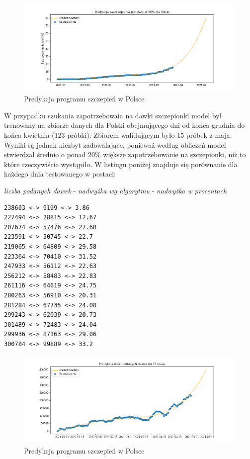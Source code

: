 \documentclass[12pt, oneside]{article}
\begin{document}
\begin{figure}[h!]
\centering
\includegraphics[height=0.25\textheight]{../img/PL_predict.png} 
\caption{Predykcja programu szczepień w Polsce}
\end{figure}

W przypadku szukania zapotrzebowaia na dawki szczepionki model był trenowany na zbiorze danych dla Polski obejmującego dni od końca grudnia do końca kwietnia (123 próbki). Zbiorem walidującym było 15 próbek z maja. Wyniki są jednak niezbyt zadowalające, ponieważ według obliczeń model stwierdzał średnio o ponad 20\% większe zapotrzebowanie na szczepionki, niż to które rzeczywiście wystąpiło. W listingu poniżej znajduje się porównanie dla każdego dnia testowanego w postaci:

 \textit{liczba podanych dawek} - \textit{nadwyżka wg algorytmu} - \textit{nadwyżka w procentach}

\begin{Verbatim}[tabsize=4]
238603 <-> 9199 <-> 3.86
227494 <-> 28815 <-> 12.67
207674 <-> 57476 <-> 27.68
223591 <-> 50745 <-> 22.7
219065 <-> 64809 <-> 29.58
223364 <-> 70410 <-> 31.52
247933 <-> 56112 <-> 22.63
256212 <-> 58483 <-> 22.83
261116 <-> 64619 <-> 24.75
280263 <-> 56910 <-> 20.31
281284 <-> 67735 <-> 24.08
299243 <-> 62039 <-> 20.73
301489 <-> 72483 <-> 24.04
299936 <-> 87163 <-> 29.06
300784 <-> 99889 <-> 33.2
\end{Verbatim}

\begin{figure}[h!]
\centering
\includegraphics[height=0.25\textheight]{../img/demand1.png} 
\caption{Predykcja programu szczepień w Polsce}
\label{Rys:boxplotSamples}
\end{figure}
\end{document}
